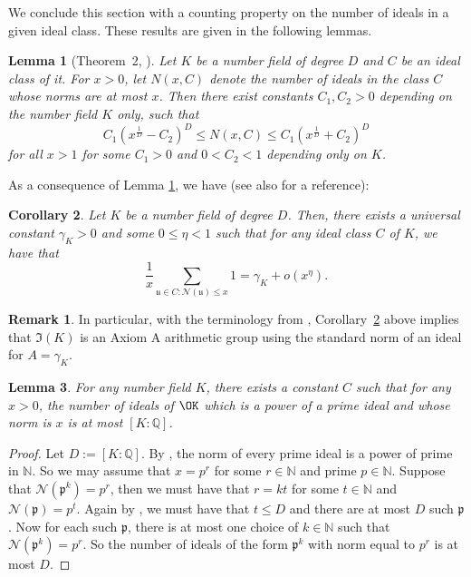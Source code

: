 \documentclass[11pt]{amsart}
\newtheorem{lemma}{Lemma}[section]
\newtheorem{corollary}[lemma]{Corollary}
\theoremstyle{definition}
\newtheorem*{remark}{Remark}
\newcommand{\N}{{\mathbb N}}
\newcommand{\NN}{{\mathcal N}}
\newcommand{\Q}{{\mathbb Q}}
\newcommand{\mf}{\mathfrak}
\begin{document}
We conclude this section with a counting property on the number of 
 ideals in a given ideal class. These results are given in the following lemmas.

 \begin{lemma}[Theorem~2, \cite{MVO07}]\label{mv7}
     Let $K$ be a number field of degree $D$ and $C$ be an ideal class of it. For $x>0$, let $N(x,C)$ denote the number of ideals in the class $C$ whose norms are at most $x$. Then there exist constants $C_1, C_2>0$ depending on the number field $K$ only, such that 
     $$C_{1}(x^{\frac{1}{D}}-C_{2})^{D}\leq N(x,C)\leq C_{1}(x^{\frac{1}{D}}+C_{2})^{D}$$
      for all $x>1$ for some $C_{1}>0$ and $0<C_{2}<1$ depending only on $K$.
 \end{lemma}

 

 As a consequence of Lemma \ref{mv7}, we have (see  also \cite[Chapter 6, Theorem 39]{marcusbook} for a reference):
\begin{corollary}\label{lem: bounds for number of ideals of norm at most x}
Let $K$ be a number field of degree $D$. Then, there exists a universal constant $\gamma_K>0$ and some $0 \leq \eta<1$ %
such that for any ideal class $C$ of $K$, we have that %
\[
\frac{1}{x}\sum_{\mf u\in C\colon \NN(\mf u) \leq x}1 = \gamma_K+o(x^{\eta}).
\]
\end{corollary}
\begin{remark}
In particular, with the terminology from \cite{lucht2001}, Corollary~\ref{lem: bounds for number of ideals of norm at most x} above implies that $\mathfrak I(K)$ is an Axiom A arithmetic group using the standard norm of an ideal for $A=\gamma_{K}$. %
\end{remark}



 \begin{lemma}\label{mv8}
     For any number field $K$, there exists a constant $C$ such that for any  $x>0$, the number of ideals of $\OK$ which is a power of a prime ideal and whose norm is $x$ is at most $[K\colon\Q]$.
 \end{lemma}
 \begin{proof}
 Let $D:=[K\colon\Q]$.
     By \cite[Lemma~2.9]{S23}, the norm of every prime ideal is a power of prime in $\N$. So we may assume that $x=p^{r}$ for some $r\in\N$ and prime $p\in\N$. Suppose that $\NN(\mf p^{k})=p^{r}$, then we must have that $r=kt$ for some $t\in\N$ and $\NN(\mf p)=p^{t}$. Again by \cite[Lemma~2.9]{S23}, we must have that $t\leq D$ and there are at most $D$ such $\mf p$. Now for each such $\mf p$, there is at most one choice of $k\in\N$ such that $\NN(\mf p^{k})=p^{r}$. So the number of ideals of the form $\mf p^{k}$ with norm equal to $p^{r}$ is at most $D$.
 \end{proof}
\end{document}
